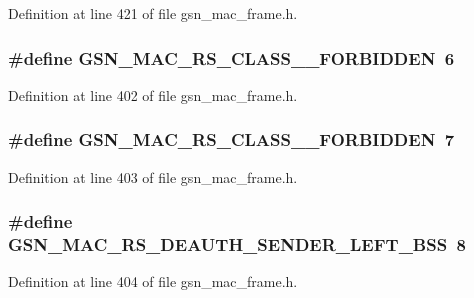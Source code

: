 Definition at line 421 of file gsn\_\-mac\_\-frame.h.

\hypertarget{a00523_aaac8115c78e3583af8aaf3a0f399b57b}{
\subsubsection[{GSN\_\-MAC\_\-RS\_\-CLASS\_\-2\_\-FORBIDDEN}]{\setlength{\rightskip}{0pt plus 5cm}\#define GSN\_\-MAC\_\-RS\_\-CLASS\_\_\-FORBIDDEN~6}}
\label{a00523_aaac8115c78e3583af8aaf3a0f399b57b}


Definition at line 402 of file gsn\_\-mac\_\-frame.h.

\hypertarget{a00523_a1c83e5f5fa3adf4a37c35475d83d5d29}{
\subsubsection[{GSN\_\-MAC\_\-RS\_\-CLASS\_\-3\_\-FORBIDDEN}]{\setlength{\rightskip}{0pt plus 5cm}\#define GSN\_\-MAC\_\-RS\_\-CLASS\_\_\-FORBIDDEN~7}}
\label{a00523_a1c83e5f5fa3adf4a37c35475d83d5d29}


Definition at line 403 of file gsn\_\-mac\_\-frame.h.

\hypertarget{a00523_a3de22c5fe875d0b9ead9fe623ba6d1ff}{
\subsubsection[{GSN\_\-MAC\_\-RS\_\-DEAUTH\_\-SENDER\_\-LEFT\_\-BSS}]{\setlength{\rightskip}{0pt plus 5cm}\#define GSN\_\-MAC\_\-RS\_\-DEAUTH\_\-SENDER\_\-LEFT\_\-BSS~8}}
\label{a00523_a3de22c5fe875d0b9ead9fe623ba6d1ff}


Definition at line 404 of file gsn\_\-mac\_\-frame.h.

